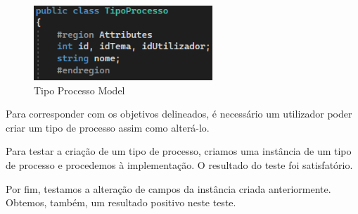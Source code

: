 \begin{figure}[!h]
\centering
\includegraphics[width=0.6\textwidth]{Figuras/Models/TipoProcessoModel.png}
\caption{Tipo Processo Model}
\label{d.model}
\end{figure}


\indent \par Para corresponder com os objetivos delineados, é necessário um utilizador poder criar um tipo de processo assim como alterá-lo.
\indent \par Para testar a criação de um tipo de processo, criamos uma instância de um tipo de processo e procedemos à implementação. O resultado do teste foi satisfatório.
\indent \par Por fim, testamos a alteração de campos da instância criada anteriormente. Obtemos, também, um resultado positivo neste teste.

